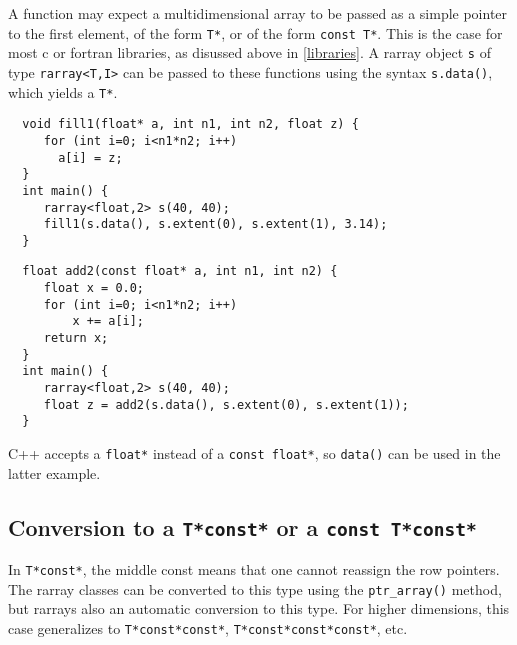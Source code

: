 \documentclass[11pt,twoside]{article}
\begin{document}
A function may expect a multidimensional array to be passed as a
simple pointer to the first element, of the form \texttt{T*}, or of
the form  \texttt{const T*}. This is the case for most c or fortran
libraries, as disussed above in \ref{libraries}. A rarray object
\texttt{s} of type \texttt{rarray{\tt<}T,I{\tt>}} can be passed to these
functions using the syntax \texttt{s.data()}, which yields a
\texttt{T*}.

\begin{framed}\vspace{-15pt}%
\begin{verbatim}
  void fill1(float* a, int n1, int n2, float z) {
     for (int i=0; i<n1*n2; i++)
       a[i] = z;
  }
  int main() {
     rarray<float,2> s(40, 40);
     fill1(s.data(), s.extent(0), s.extent(1), 3.14);
  }
\end{verbatim}%
\end{framed}

\pagebreak[3]

\vspace{-5pt}\begin{framed}\vspace{-14pt}%
\begin{verbatim}
  float add2(const float* a, int n1, int n2) {
     float x = 0.0;
     for (int i=0; i<n1*n2; i++)
         x += a[i];
     return x;
  }
  int main() {
     rarray<float,2> s(40, 40);
     float z = add2(s.data(), s.extent(0), s.extent(1));
  }
\end{verbatim}%
\vspace{-14pt}\end{framed}\vspace{-8pt}

\noindent
C++ accepts a \texttt{float*} instead of a \texttt{const float*}, so \texttt{data()} can be used in the latter example.

\subsection{Conversion to a {\tt T*const*} or a {\tt const T*const*} }

\noindent
In \texttt{T*const*}, the middle const means that one cannot reassign
the row pointers. 
The rarray classes can be converted to this type using the
\texttt{ptr\_array()} method, but rarrays  also an automatic
conversion to this type.
For higher dimensions, this case generalizes to \texttt{T*const*const*}, \texttt{T*const*const*const*}, etc.
\end{document}
